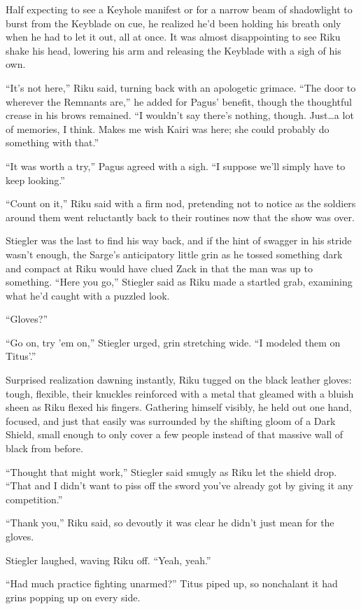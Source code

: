Half expecting to see a Keyhole manifest or for a narrow beam of shadowlight to burst from the Keyblade on cue, he realized he'd been holding his breath only when he had to let it out, all at once. It was almost disappointing to see Riku shake his head, lowering his arm and releasing the Keyblade with a sigh of his own.

``It's not here,'' Riku said, turning back with an apologetic grimace. ``The door to wherever the Remnants are,'' he added for Pagus' benefit, though the thoughtful crease in his brows remained. ``I wouldn't say there's nothing, though. Just\ldots a lot of memories, I think. Makes me wish Kairi was here; she could probably do something with that.''

``It was worth a try,'' Pagus agreed with a sigh. ``I suppose we'll simply have to keep looking.''

``Count on it,'' Riku said with a firm nod, pretending not to notice as the soldiers around them went reluctantly back to their routines now that the show was over.

Stiegler was the last to find his way back, and if the hint of swagger in his stride wasn't enough, the Sarge's anticipatory little grin as he tossed something dark and compact at Riku would have clued Zack in that the man was up to something. ``Here you go,'' Stiegler said as Riku made a startled grab, examining what he'd caught with a puzzled look.

``Gloves?''

``Go on, try 'em on,'' Stiegler urged, grin stretching wide. ``I modeled them on Titus'.''

Surprised realization dawning instantly, Riku tugged on the black leather gloves: tough, flexible, their knuckles reinforced with a metal that gleamed with a bluish sheen as Riku flexed his fingers. Gathering himself visibly, he held out one hand, focused, and just that easily was surrounded by the shifting gloom of a Dark Shield, small enough to only cover a few people instead of that massive wall of black from before.

``Thought that might work,'' Stiegler said smugly as Riku let the shield drop. ``That and I didn't want to piss off the sword you've already got by giving it any competition.''

``Thank you,'' Riku said, so devoutly it was clear he didn't just mean for the gloves.

Stiegler laughed, waving Riku off. ``Yeah, yeah.''

``Had much practice fighting unarmed?'' Titus piped up, so nonchalant it had grins popping up on every side.

